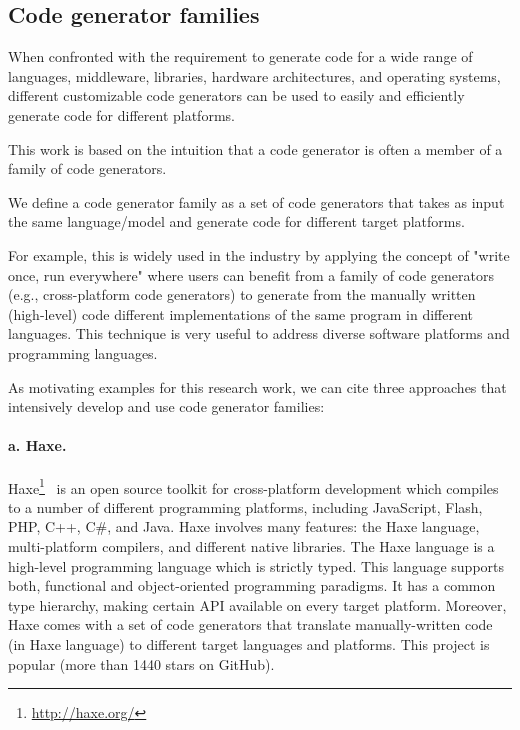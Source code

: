 \subsection{Code generator families}
When confronted with the requirement to generate code for a wide range of languages, middleware, libraries, hardware architectures, and operating systems, different customizable code generators can be used to easily and efficiently  generate code for different platforms.

This work is based on the intuition that a code generator is often a member of a family of code generators\cite{chae2008building}.

\begin{mydef}
	We define a code generator family as a set of code generators that takes as input the same language/model and generate code for different target platforms.
\end{mydef}

For example, this is widely used in the industry by applying the concept of "write once, run everywhere" where users can benefit from a family of code generators (e.g., cross-platform code generators\cite{fumero2015runtime}) to generate from the manually written (high-level) code different implementations of the same program in different languages. This technique is very useful to address diverse software platforms and programming languages.

As motivating examples for this research work, we can cite three approaches that intensively develop and use code generator families: 
\paragraph{a. Haxe.} 	Haxe\footnote{\url{http://haxe.org/}}~\cite{dasnois2011haxe} is an open source toolkit for cross-platform development which compiles to a number of different programming platforms, including JavaScript, Flash, PHP, C++, C\#, and Java. Haxe involves many features: the Haxe language, multi-platform compilers, and different native libraries. The Haxe language is a high-level programming language which is strictly typed. This language supports both, functional and object-oriented programming paradigms. It has a common type hierarchy, making certain API available on every target platform. Moreover, Haxe comes with a set of code generators that translate manually-written code (in Haxe language) to different target languages and platforms.  
This project is popular (more than \num{1440} stars on GitHub).

